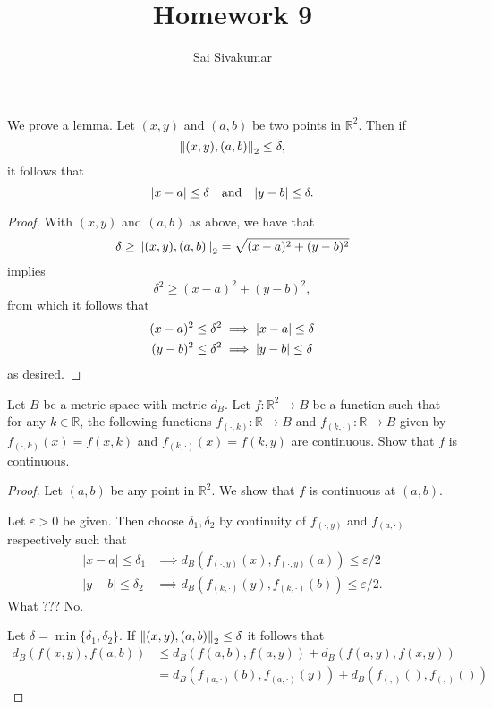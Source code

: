 \documentclass[12pt]{amsart}
\title{Homework 9}
\author{Sai Sivakumar}
\begin{document}
We prove a lemma. Let $(x,y)$ and $(a,b)$ be two points in $\mathbb{R}^2$. Then if \[\norm{(x,y),(a,b)}_2 \leq \delta,\] it follows that \[\abs{x-a} \leq \delta \quad \text{and}\quad \abs{y-b}\leq \delta.\] \begin{proof}
    With $(x,y)$ and $(a,b)$ as above, we have that \[\delta \geq \norm{(x,y),(a,b)}_2 = \sqrt{(x-a)^2+(y-b)^2}\] implies
    \[\delta^2 \geq (x-a)^2+(y-b)^2,\] from which it follows that \begin{align*}
        (x-a)^2 \leq \delta^2 &\implies \abs{x-a}\leq \delta \\
        (y-b)^2 \leq \delta^2 &\implies \abs{y-b}\leq \delta
    \end{align*} as desired.
\end{proof} 

Let $B$ be a metric space with metric $d_B$. Let $f\colon \mathbb{R}^2\to B$ be a function such that for any $k\in \mathbb{R}$, the following functions $f_{(\cdot,k)}\colon \mathbb{R}\to B$ and $f_{(k,\cdot)}\colon \mathbb{R}\to B$ given by $f_{(\cdot,k)}(x) = f(x,k)$ and $f_{(k,\cdot)}(x) = f(k,y)$ are continuous. Show that $f$ is continuous.\begin{proof}
    Let $(a,b)$ be any point in $\mathbb{R}^2$. We show that $f$ is continuous at $(a,b)$.

    Let $\varepsilon>0$ be given. Then choose $\delta_1,\delta_2$ by continuity of $f_{(\cdot,y)}$ and $f_{(a,\cdot)}$ respectively such that \begin{align*}
        |x-a|\leq \delta_1 &\implies d_B(f_{(\cdot,y)}(x),f_{(\cdot,y)}(a)) \leq \varepsilon/2 \\
        |y-b|\leq \delta_2 &\implies d_B(f_{(k,\cdot)}(y),f_{(k,\cdot)}(b)) \leq \varepsilon/2.
    \end{align*} What ??? No.

    Let $\delta = \min\{\delta_1,\delta_2\}$. If $\norm{(x,y),(a,b)}_2 \leq \delta$ it follows that \begin{align*}
        d_B(f(x,y),f(a,b)) &\leq d_B(f(a,b),f(a,y)) + d_B(f(a,y),f(x,y))\\
        &=d_B(f_{(a ,\cdot )}(b) , f_{(a ,\cdot )}(y)) + d_B(f_{( , )}() , f_{( , )}()) 
    \end{align*}
\end{proof}
\end{document}
